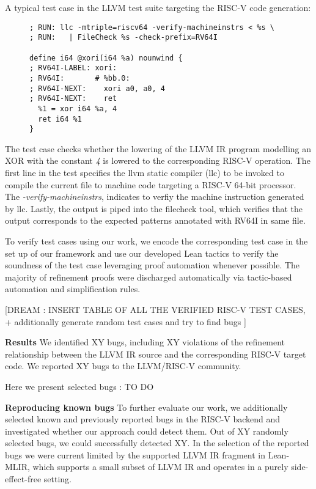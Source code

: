 A typical test case in the LLVM test suite targeting the  RISC-V code generation:
\begin{figure}[ht]
\centering
\begin{minipage}{\textwidth}
\begin{lstlisting}
; RUN: llc -mtriple=riscv64 -verify-machineinstrs < %s \
; RUN:   | FileCheck %s -check-prefix=RV64I

define i64 @xori(i64 %a) nounwind {
; RV64I-LABEL: xori:
; RV64I:       # %bb.0:
; RV64I-NEXT:    xori a0, a0, 4
; RV64I-NEXT:    ret
  %1 = xor i64 %a, 4
  ret i64 %1
}
\end{lstlisting}
\end{minipage}
\end{figure}

The test case checks whether the lowering of the LLVM IR program modelling an XOR with the constant \textit{4} is lowered to the corresponding RISC-V operation. The first line in the test specifies the llvm static compiler (llc) to be invoked to compile the current file to machine code targeting a RISC-V 64-bit processor. The 
\textit{-verify-machineinstrs}, indicates to verfiy the machine instruction generated by llc. Lastly, the output is piped into the filecheck tool, which verifies that the output corresponds to the expected patterns annotated with RV64I in same file.

To verify test cases using our work, we encode the corresponding test case in the set up of our framework and use our developed Lean tactics to verify the soundness of the test case leveraging proof automation whenever possible. The majority of refinement proofs were discharged automatically via tactic-based automation and simplification rules.

[DREAM : INSERT TABLE OF ALL THE VERIFIED RISC-V TEST CASES,
+ additionally generate random test cases and try to find bugs ]



\textbf{Results}
We identified XY bugs, including XY violations of the refinement relationship between the LLVM IR source and the corresponding RISC-V target code. We reported XY bugs to the LLVM/RISC-V community. 

Here we present selected bugs :
TO DO

\textbf{Reproducing known bugs}
To further evaluate our work, we additionally selected known and previously reported bugs in the RISC-V backend and investigated whether our approach could detect them. Out of XY randomly selected bugs, we could successfully detected XY. In the selection of the reported bugs we were current limited by the supported LLVM IR fragment in Lean-MLIR, which supports a small subset of LLVM IR and operates in a purely side-effect-free setting.

